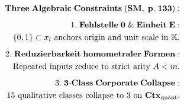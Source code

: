 \documentclass[preview]{standalone}
\begin{document}
\begin{align*}
\special{dvisvgm:raw <g id='unique000'>}\mathbf{Three\;Algebraic\;Constraints\;(SM,\;p.\;133):}\\[5pt]1.\;\mathbf{Fehlstelle\;0\;\&\;Einheit\;E:}\\\;\;\{0, 1\}\subset x_l\text{ anchors origin and unit scale in }\mathbb{K}.\\[5pt]2.\;\mathbf{Reduzierbarkeit\;homometraler\;Formen:}\\\;\;\text{Repeated inputs reduce to strict arity }A < m.\\[5pt]3.\;\mathbf{3\text{-}Class\;Corporate\;Collapse:}\\\;\;15\text{ qualitative classes collapse to }3\text{ on }\mathbf{Ctx}_{\text{quant}}.\special{dvisvgm:raw </g>}
\end{align*}
\end{document}
